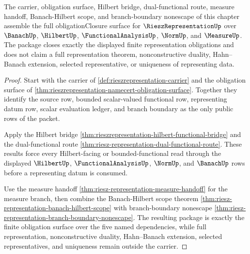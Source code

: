 \begin{theorem}
\label{thm:riesz-representation-obligation-closure}
The carrier, obligation surface, Hilbert bridge, dual-functional route, measure handoff, Banach-Hilbert scope, and branch-boundary nonescape of this chapter assemble the full obligationClosure surface for $\RieszRepresentationUp$ over $\BanachUp$, $\HilbertUp$, $\FunctionalAnalysisUp$, $\NormUp$, and $\MeasureUp$. The package closes exactly the displayed finite representation obligations and does not claim a full representation theorem, nonconstructive duality, Hahn--Banach extension, selected representative, or uniqueness of representing data.
\end{theorem}
\begin{proof}
Start with the carrier of \autoref{def:rieszrepresentation-carrier} and the obligation surface of \autoref{thm:rieszrepresentation-namecert-obligation-surface}. Together they identify the source row, bounded scalar-valued functional row, representing datum row, scalar evaluation ledger, and branch boundary as the only public rows of the packet.

Apply the Hilbert bridge \autoref{thm:rieszrepresentation-hilbert-functional-bridge} and the dual-functional route \autoref{thm:riesz-representation-dual-functional-route}. These results force every Hilbert-facing or bounded-functional read through the displayed $\HilbertUp$, $\FunctionalAnalysisUp$, $\NormUp$, and $\BanachUp$ rows before a representing datum is consumed.

Use the measure handoff \autoref{thm:riesz-representation-measure-handoff} for the measure branch, then combine the Banach-Hilbert scope theorem \autoref{thm:riesz-representation-banach-hilbert-scope} with branch-boundary nonescape \autoref{thm:riesz-representation-branch-boundary-nonescape}. The resulting package is exactly the finite obligation surface over the five named dependencies, while full representation, nonconstructive duality, Hahn--Banach extension, selected representatives, and uniqueness remain outside the carrier.
\end{proof}

